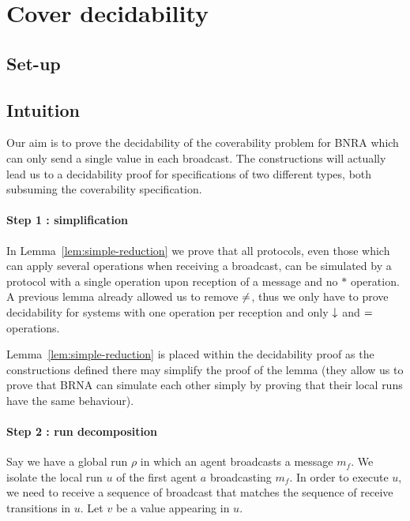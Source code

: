 \section{Cover decidability}
\label{sec:cover-decidability}

\subsection{Set-up}
\label{sec:decidability-set-up}

\ifintuition
\subsection{Intuition}

Our aim is to prove the decidability of the coverability problem for BNRA which can only send a single value in each broadcast. The constructions will actually lead us to a decidability proof for specifications of two different types, both subsuming the coverability specification.

\paragraph*{Step 1 : simplification} In Lemma~\ref{lem:simple-reduction} we prove that all protocols, even those which can apply several operations when receiving a broadcast, can be simulated by a protocol with a single operation upon reception of a message and no $*$ operation. A previous lemma already allowed us to remove ${\ne}$, thus we only have to prove decidability for systems with one operation per reception and only $\downarrow$ and ${=}$ operations.

Lemma~\ref{lem:simple-reduction} is placed within the decidability proof as the constructions defined there may simplify the proof of the lemma (they allow us to prove that BRNA can simulate each other simply by proving that their local runs have the same behaviour).

\paragraph*{Step 2 : run decomposition} Say we have a global run $\rho$ in which an agent broadcasts a message $m_f$. We isolate the local run $u$ of the first agent $a$ broadcasting $m_f$.
In order to execute $u$, we need to receive a sequence of broadcast that matches the sequence of receive transitions in $u$. Let $v$ be a value appearing in $u$.

